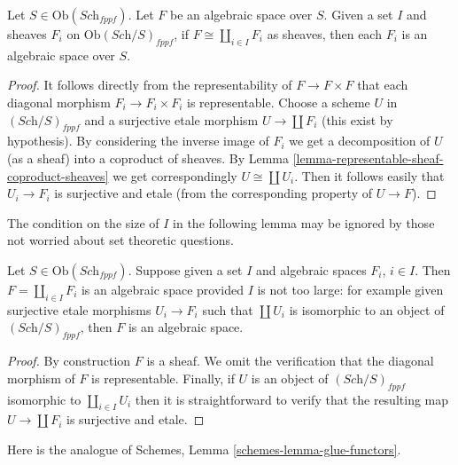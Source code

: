 \begin{lemma}
\label{lemma-algebraic-space-coproduct-sheaves}
Let $S \in \text{Ob}(\textit{Sch}_{fppf})$.
Let $F$ be an algebraic space over $S$.
Given a set $I$ and sheaves $F_i$ on
$\text{Ob}(\textit{Sch}/S)_{fppf}$,
if $F \cong \coprod_{i\in I} F_i$ as sheaves,
then each $F_i$ is an algebraic space over $S$.
\end{lemma}

\begin{proof}
It follows directly from the representability of
$F \to F \times F$ that each diagonal morphism
$F_i \to F_i \times F_i$ is representable.
Choose a scheme $U$ in $(\textit{Sch}/S)_{fppf}$ and a surjective
etale morphism $U \to \coprod F_i$ (this exist by hypothesis).
By considering the inverse image of $F_i$ we get a decomposition
of $U$ (as a sheaf) into a coproduct of sheaves.
By Lemma \ref{lemma-representable-sheaf-coproduct-sheaves}
we get correspondingly $U \cong \coprod U_i$.
Then it follows easily that $U_i \to F_i$ is surjective
and etale (from the corresponding property of $U \to F$).
\end{proof}

\noindent
The condition on the size of $I$ in the
following lemma may be ignored by those not worried about
set theoretic questions.

\begin{lemma}
\label{lemma-coproduct-algebraic-spaces}
Let $S \in \text{Ob}(\textit{Sch}_{fppf})$.
Suppose given a set $I$ and algebraic spaces $F_i$, $i \in I$.
Then $F = \coprod_{i \in I} F_i$ is an algebraic space
provided $I$ is not too large: for example given
surjective etale morphisms $U_i \to F_i$ such that
$\coprod U_i$ is isomorphic to an object of $(\textit{Sch}/S)_{fppf}$,
then $F$ is an algebraic space.
\end{lemma}

\begin{proof}
By construction $F$ is a sheaf. We omit the verification that the
diagonal morphism of $F$ is representable. Finally, if $U$ is an
object of $(\textit{Sch}/S)_{fppf}$ isomorphic to $\coprod_{i \in I} U_i$
then it is straightforward to verify that the resulting map
$U \to \coprod F_i$ is surjective and etale.
\end{proof}

\noindent
Here is the analogue of Schemes, Lemma \ref{schemes-lemma-glue-functors}.

